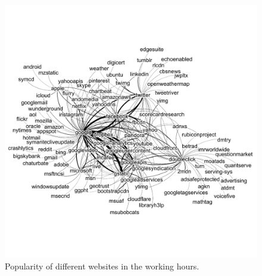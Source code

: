 \documentclass[letterpaper,twocolumn]{article}
\begin{document}
\begin{figure}[t]
\centering
 \vspace{-75pt}
\includegraphics[width=\textwidth]{img/WorkingLength2Cluster}
\vspace{-88pt}
\caption{Popularity of different websites in the working hours.}
 \label{fig:work}
 \vspace{-15pt}
\endminipage
 \end{figure}
 
\end{document}
